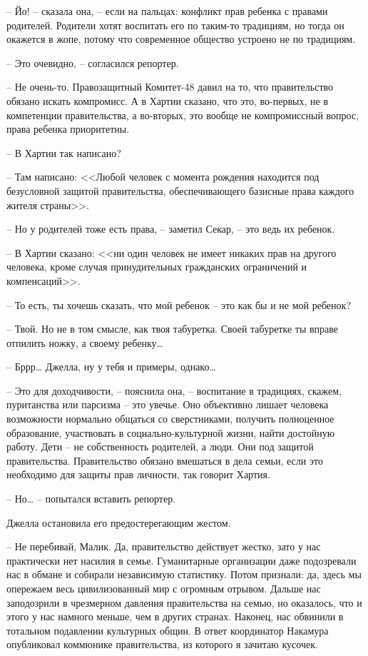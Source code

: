 -- Йо! -- сказала она, -- если на пальцах: конфликт прав ребенка с правами родителей. Родители хотят воспитать его по таким-то традициям, но тогда он окажется в жопе, потому что современное общество устроено не по традициям.

-- Это очевидно, -- согласился репортер.

-- Не очень-то. Правозащитный Комитет-48 давил на то, что правительство обязано искать компромисс. А в Хартии сказано, что это, во-первых, не в компетенции правительства, а во-вторых, это вообще не компромиссный вопрос, права ребенка приоритетны.

-- В Хартии так написано?

-- Там написано: <<Любой человек с момента рождения находится под безусловной защитой правительства, обеспечивающего базисные права каждого жителя страны>>.

-- Но у родителей тоже есть права, -- заметил Секар, -- это ведь их ребенок.

-- В Хартии сказано: <<ни один человек не имеет никаких прав на другого человека, кроме случая принудительных гражданских ограничений и компенсаций>>.

-- То есть, ты хочешь сказать, что мой ребенок -- это как бы и не мой ребенок?

-- Твой. Но не в том смысле, как твоя табуретка. Своей табуретке ты вправе отпилить ножку, а своему ребенку\ldots{}

-- Бррр\ldots{} Джелла, ну у тебя и примеры, однако\ldots{}

-- Это для доходчивости, -- пояснила она, -- воспитание в традициях, скажем, пуританства или парсизма -- это увечье. Оно объективно лишает человека возможности нормально общаться со сверстниками, получить полноценное образование, участвовать в социально-культурной жизни, найти достойную работу. Дети -- не собственность родителей, а люди. Они под защитой правительства. Правительство обязано вмешаться в дела семьи, если это необходимо для защиты прав личности, так говорит Хартия.

-- Но\ldots{} -- попытался вставить репортер.

Джелла остановила его предостерегающим жестом.

-- Не перебивай, Малик. Да, правительство действует жестко, зато у нас практически нет насилия в семье. Гуманитарные организации даже подозревали нас в обмане и собирали независимую статистику. Потом признали: да, здесь мы опережаем весь цивилизованный мир с огромным отрывом. Дальше нас заподозрили в чрезмерном давления правительства на семью, но оказалось, что и этого у нас намного меньше, чем в других странах. Наконец, нас обвинили в тотальном подавлении культурных общин. В ответ координатор Накамура опубликовал коммюнике правительства, из которого я зачитаю кусочек.

